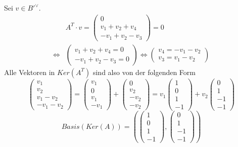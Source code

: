 \documentclass[a4paper,10pt]{article}
\begin{document}
Sei $v \in B'^\vee$.
\begin{align}
 & A^T \cdot v = 
  \begin{pmatrix}
   0\\
   v_1 + v_2 + v_4\\
   -v_1 + v_2 - v_3
  \end{pmatrix} = 0\\
 \Leftrightarrow & 
  \begin{pmatrix}
   v_1 + v_2 + v_4 = 0\\
   -v_1 + v_2 - v_3 = 0
  \end{pmatrix}
 \Leftrightarrow
  \begin{pmatrix}
   v_4 = -v_1 - v_2\\
   v_3 = v_1 - v_2
  \end{pmatrix}
\end{align}
Alle Vektoren in $Ker(A^T)$ sind also von der folgenden Form
\begin{equation}
 \begin{pmatrix}
  v_1\\
  v_2\\
  v_1 - v_2\\
  -v_1 - v_2
 \end{pmatrix} =
 \begin{pmatrix}
  v_1\\
  0\\
  v_1\\
  -v_1
 \end{pmatrix} + 
 \begin{pmatrix}
  0\\
  v_2\\
  -v_2\\
  -v_2
 \end{pmatrix} = 
 v_1
 \begin{pmatrix}
  1\\
  0\\
  1\\
  -1
 \end{pmatrix} + 
 v_2
 \begin{pmatrix}
  0\\
  1\\
  -1\\
  -1
 \end{pmatrix}
\end{equation}
\begin{equation}
 Basis(Ker(A)) = \left(
  \begin{pmatrix}
   1\\
   0\\
   1\\
   -1
  \end{pmatrix},
  \begin{pmatrix}
   0\\
   1\\
   -1\\
   -1
  \end{pmatrix}
 \right)
\end{equation}
\end{document}

